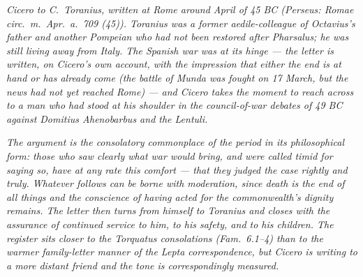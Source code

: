 
\textit{Cicero to C.~Toranius, written at Rome around April of
45 BC (Perseus: \textit{Romae circ.~m.~Apr.~a.~709 (45)}). Toranius
was a former aedile-colleague of Octavius's father and another
Pompeian who had not been restored after Pharsalus; he was still
living away from Italy. The Spanish war was at its hinge --- the
letter is written, on Cicero's own account, with the impression
that either the end is at hand or has already come (the battle of
Munda was fought on 17 March, but the news had not yet reached
Rome) --- and Cicero takes the moment to reach across to a man
who had stood at his shoulder in the council-of-war debates of
49 BC against Domitius Ahenobarbus and the Lentuli.}

\textit{The argument is the consolatory commonplace of the
period in its philosophical form: those who saw clearly what war
would bring, and were called timid for saying so, have at any
rate this comfort --- that they judged the case rightly and
truly. Whatever follows can be borne with moderation, since
death is the end of all things and the conscience of having
acted for the commonwealth's dignity remains. The letter then
turns from himself to Toranius and closes with the assurance
of continued service to him, to his safety, and to his children.
The register sits closer to the Torquatus consolations
(\textit{Fam.}~6.1--4) than to the warmer family-letter manner
of the Lepta correspondence, but Cicero is writing to a more
distant friend and the tone is correspondingly measured.}
